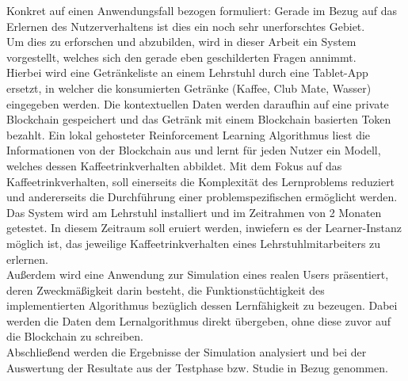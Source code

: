 Konkret auf einen Anwendungsfall bezogen formuliert: 
Gerade im Bezug auf das Erlernen des Nutzerverhaltens ist dies ein noch sehr unerforschtes Gebiet. \\
Um dies zu erforschen und abzubilden, wird in dieser Arbeit ein System vorgestellt, welches sich den gerade eben geschilderten Fragen annimmt. \\
Hierbei wird eine Getränkeliste an einem Lehrstuhl durch eine Tablet-App ersetzt, in welcher die konsumierten Getränke (Kaffee, Club Mate, Wasser) eingegeben werden. 
Die kontextuellen Daten werden daraufhin auf eine private Blockchain gespeichert und das Getränk mit einem Blockchain basierten Token bezahlt. 
Ein lokal gehosteter Reinforcement Learning Algorithmus liest die Informationen von der Blockchain aus und lernt für jeden Nutzer ein Modell, welches dessen Kaffeetrinkverhalten abbildet. Mit dem Fokus auf das Kaffeetrinkverhalten, soll einerseits die Komplexität des Lernproblems reduziert und andererseits die Durchführung einer problemspezifischen  ermöglicht werden. \\
Das System wird am Lehrstuhl installiert und im Zeitrahmen von 2 Monaten getestet. In diesem Zeitraum soll eruiert werden, inwiefern es der Learner-Instanz möglich ist, das jeweilige Kaffeetrinkverhalten eines Lehrstuhlmitarbeiters zu erlernen. \\
Außerdem wird eine Anwendung zur Simulation eines realen Users präsentiert, deren Zweckmäßigkeit darin besteht, die Funktionstüchtigkeit des implementierten Algorithmus bezüglich dessen Lernfähigkeit zu bezeugen. Dabei werden die Daten dem Lernalgorithmus direkt übergeben, ohne diese zuvor auf die Blockchain zu schreiben. \\
Abschließend werden die Ergebnisse der Simulation analysiert und bei der Auswertung der Resultate aus der Testphase bzw. Studie in Bezug genommen. 

